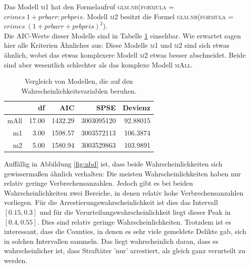 Das Modell \textsc{m1} hat den Formelaufruf \textsc{glm.nb(formula = $crimes ~ 1 + prbarr:prbpris$}.
Modell \textsc{m2} besitzt die Formel \textsc{glm.nb(formula = $crimes ~ (1 + prbarr + prbpris)^2$)}. \\
Die AIC-Werte dieser Modelle sind in Tabelle \ref{tab:sfm} einsehbar.
Wie erwartet sagen hier alle Kriterien \"Ahnliches aus:
Diese Modelle \textsc{m1} und \textsc{m2} sind sich etwas \"ahnlich, wobei das etwas komplexere Modell \textsc{m2} etwas besser abschneidet.
Beide sind aber wesentlich schlechter als das komplexe Modell \textsc{mAll}. 

\begin{table}[ht]
\centering
\begin{tabular}{rrrrr}
  \hline
 & df & AIC & SPSE & Devienz\\ 
  \hline
mAll & 17.00 & 1432.29 & 3003095120 & 92.88015 \\ 
  m1 & 3.00 & 1598.57 & 3003572113 & 106.3874\\ 
  m2 & 5.00 & 1580.94 & 3003529863 & 103.9891\\ 
   \hline
\end{tabular}
\caption{Vergleich von Modellen, die auf den Wahrscheinlichkeitsvariablen beruhen.}
\label{tab:sfm}
\end{table}

Auff\"allig in Abbildung \ref{fig:nbd} ist, dass beide Wahrscheinlichkeiten sich gewisserma\ss{}en \"ahnlich verhalten:
Die meisten Wahrscheinlichkeiten haben nur relativ geringe Verbrechensanzahlen.
Jedoch gibt es bei beiden Wahrscheinlichkeiten zwei Bereiche, in denen relativ hohe Verbrechensanzahlen vorliegen.
F\"ur die Arrestierungswahrscheinlichkeit ist dies das Intervall $[0.15, 0.3]$ und f\"ur die Verurteilungswahrscheinlichkeit liegt dieser Peak in $[0.4, 0.55]$.
Dies sind relativ geringe Wahrscheinlichkeiten.
Trotzdem ist es interessant, dass die Counties, in denen es sehr viele gemeldete Delikte gab, sich in solchen Intervallen sammeln.
Das liegt wahrscheinlich daran, dass es wahrscheinlicher ist, dass Straft\"ater 'nur' arrestiert, als gleich ganz verurteilt zu werden.
 

